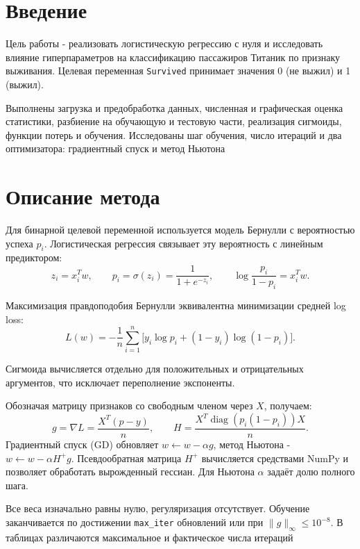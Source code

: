 \documentclass[a4paper,12pt]{article}
\begin{document}


\begin{centering}
    \renewcommand{\contentsname}{Содержание}
    \tableofcontents
\end{centering}
\newpage

\section{Введение}

Цель работы - реализовать логистическую регрессию с нуля и исследовать влияние гиперпараметров на классификацию пассажиров Титаник по признаку выживания. Целевая переменная \texttt{Survived} принимает значения 0 (не выжил) и 1 (выжил).

Выполнены загрузка и предобработка данных, численная и графическая оценка статистики, разбиение на обучающую и тестовую части, реализация сигмоиды, функции потерь и обучения. Исследованы шаг обучения, число итераций и два оптимизатора: градиентный спуск и метод Ньютона

\section{Описание метода}

Для бинарной целевой переменной используется модель Бернулли с вероятностью успеха $p_i$. Логистическая регрессия связывает эту вероятность с линейным предиктором:
\[
 z_i=x_i^Tw,\qquad p_i=\sigma(z_i)=\frac{1}{1+e^{-z_i}},
 \qquad \log\frac{p_i}{1-p_i}=x_i^Tw.
\]

Максимизация правдоподобия Бернулли эквивалентна минимизации средней log loss:
\[
 L(w)=-\frac1n\sum_{i=1}^{n}\bigl[y_i\log p_i+(1-y_i)\log(1-p_i)\bigr].
\]

Сигмоида вычисляется отдельно для положительных и отрицательных аргументов, что исключает переполнение экспоненты.

Обозначая матрицу признаков со свободным членом через $X$, получаем:
\[
 g=\nabla L=\frac{X^T(p-y)}n,\qquad
 H=\frac{X^T\operatorname{diag}(p_i(1-p_i))X}n.
\]
Градиентный спуск (GD) обновляет $w\leftarrow w-\alpha g$, метод Ньютона - $w\leftarrow w-\alpha H^+g$. Псевдообратная матрица $H^+$ вычисляется средствами NumPy и позволяет обработать вырожденный гессиан. Для Ньютона $\alpha$ задаёт долю полного шага.

Все веса изначально равны нулю, регуляризация отсутствует. Обучение заканчивается по достижении \texttt{max\_iter} обновлений или при $\|g\|_\infty\leq10^{-8}$. В таблицах различаются максимальное и фактическое числа итераций
\end{document}
